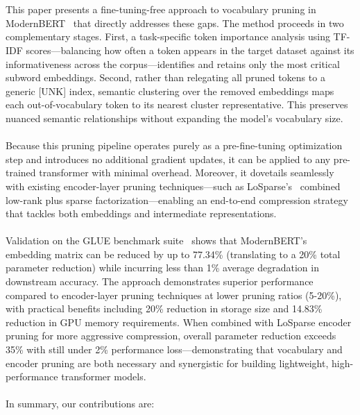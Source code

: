 \documentclass[twocolumn]{article}
\begin{document}
\\ \\
This paper presents a fine-tuning-free approach to vocabulary pruning in ModernBERT~\cite{modernbert2023} that directly addresses these gaps. The method proceeds in two complementary stages. First, a task-specific token importance analysis using TF-IDF scores---balancing how often a token appears in the target dataset against its informativeness across the corpus---identifies and retains only the most critical subword embeddings. Second, rather than relegating all pruned tokens to a generic [UNK] index, semantic clustering over the removed embeddings maps each out-of-vocabulary token to its nearest cluster representative. This preserves nuanced semantic relationships without expanding the model's vocabulary size.
\\ \\
Because this pruning pipeline operates purely as a pre-fine-tuning optimization step and introduces no additional gradient updates, it can be applied to any pre-trained transformer with minimal overhead. Moreover, it dovetails seamlessly with existing encoder-layer pruning techniques---such as LoSparse's~\cite{losparse2023} combined low-rank plus sparse factorization---enabling an end-to-end compression strategy that tackles both embeddings and intermediate representations.
\\ \\
Validation on the GLUE benchmark suite~\cite{wang2018glue} shows that ModernBERT's embedding matrix can be reduced by up to 77.34\% (translating to a 20\% total parameter reduction) while incurring less than 1\% average degradation in downstream accuracy. The approach demonstrates superior performance compared to encoder-layer pruning techniques at lower pruning ratios (5-20\%), with practical benefits including 20\% reduction in storage size and 14.83\% reduction in GPU memory requirements. When combined with LoSparse encoder pruning for more aggressive compression, overall parameter reduction exceeds 35\% with still under 2\% performance loss---demonstrating that vocabulary and encoder pruning are both necessary and synergistic for building lightweight, high-performance transformer models.
\\ \\
In summary, our contributions are:
\end{document}
